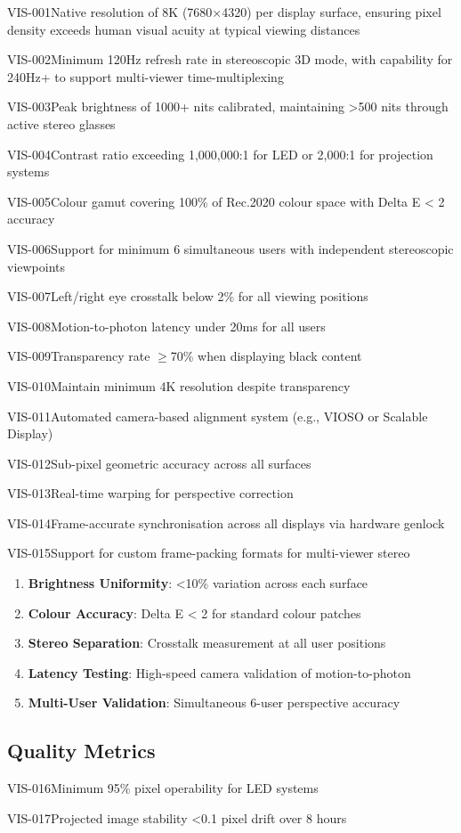 \begin{requirement}{VIS-001}{Native resolution of 8K (7680×4320) per display surface, ensuring pixel density exceeds human visual acuity at typical viewing distances}
\begin{requirement}{VIS-002}{Minimum 120Hz refresh rate in stereoscopic 3D mode, with capability for 240Hz+ to support multi-viewer time-multiplexing}
\begin{requirement}{VIS-003}{Peak brightness of 1000+ nits calibrated, maintaining >500 nits through active stereo glasses}
\begin{requirement}{VIS-004}{Contrast ratio exceeding 1,000,000:1 for LED or 2,000:1 for projection systems}
\begin{requirement}{VIS-005}{Colour gamut covering 100\% of Rec.2020 colour space with Delta E < 2 accuracy}
\begin{requirement}{VIS-006}{Support for minimum 6 simultaneous users with independent stereoscopic viewpoints}
\begin{requirement}{VIS-007}{Left/right eye crosstalk below 2\% for all viewing positions}
\begin{requirement}{VIS-008}{Motion-to-photon latency under 20ms for all users}
\begin{requirement}{VIS-009}{Transparency rate $\ge$70\% when displaying black content}
\begin{requirement}{VIS-010}{Maintain minimum 4K resolution despite transparency}
\begin{requirement}{VIS-011}{Automated camera-based alignment system (e.g., VIOSO or Scalable Display)}
\begin{requirement}{VIS-012}{Sub-pixel geometric accuracy across all surfaces}
\begin{requirement}{VIS-013}{Real-time warping for perspective correction}
\begin{requirement}{VIS-014}{Frame-accurate synchronisation across all displays via hardware genlock}
\begin{requirement}{VIS-015}{Support for custom frame-packing formats for multi-viewer stereo}
\begin{enumerate}
    \item \textbf{Brightness Uniformity}: <10\% variation across each surface
    \item \textbf{Colour Accuracy}: Delta E < 2 for standard colour patches
    \item \textbf{Stereo Separation}: Crosstalk measurement at all user positions
    \item \textbf{Latency Testing}: High-speed camera validation of motion-to-photon
    \item \textbf{Multi-User Validation}: Simultaneous 6-user perspective accuracy
\end{enumerate}

\subsection{Quality Metrics}

\begin{requirement}{VIS-016}{Minimum 95\% pixel operability for LED systems}

\begin{requirement}{VIS-017}{Projected image stability <0.1 pixel drift over 8 hours}


\end{requirement}
\end{requirement}
\end{requirement}
\end{requirement}
\end{requirement}
\end{requirement}
\end{requirement}
\end{requirement}
\end{requirement}
\end{requirement}
\end{requirement}
\end{requirement}
\end{requirement}
\end{requirement}
\end{requirement}
\end{requirement}
\end{requirement}
